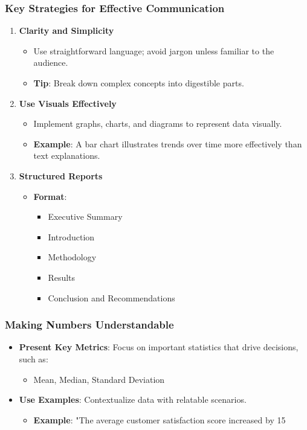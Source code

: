 \documentclass[aspectratio=169]{beamer}
\begin{document}
\begin{frame}[fragile]
    \frametitle{Key Strategies for Effective Communication}
    \begin{enumerate}
        \item \textbf{Clarity and Simplicity}
            \begin{itemize}
                \item Use straightforward language; avoid jargon unless familiar to the audience.
                \item \textbf{Tip}: Break down complex concepts into digestible parts.
            \end{itemize}
        \item \textbf{Use Visuals Effectively}
            \begin{itemize}
                \item Implement graphs, charts, and diagrams to represent data visually.
                \item \textbf{Example}: A bar chart illustrates trends over time more effectively than text explanations.
            \end{itemize}
        \item \textbf{Structured Reports}
            \begin{itemize}
                \item \textbf{Format}:
                    \begin{itemize}
                        \item Executive Summary
                        \item Introduction
                        \item Methodology
                        \item Results
                        \item Conclusion and Recommendations
                    \end{itemize}
            \end{itemize}
    \end{enumerate}
\end{frame}

\begin{frame}[fragile]
    \frametitle{Making Numbers Understandable}
    \begin{itemize}
        \item \textbf{Present Key Metrics}: Focus on important statistics that drive decisions, such as:
            \begin{itemize}
                \item Mean, Median, Standard Deviation
            \end{itemize}
        \item \textbf{Use Examples}: Contextualize data with relatable scenarios.
            \begin{itemize}
                \item \textbf{Example}: "The average customer satisfaction score increased by 15%
            \end{itemize}
    \end{itemize}
\end{frame}
\end{document}
